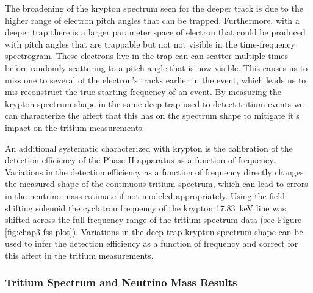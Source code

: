 The broadening of the krypton spectrum seen for the deeper track is due to the higher range of electron pitch angles that can be trapped. Furthermore, with a deeper trap there is a larger parameter space of electron that could be produced with pitch angles that are trappable but not not visible in the time-frequency spectrogram. These electrons live in the trap can can scatter multiple times before randomly scattering to a pitch angle that is now visible. This causes us to miss one to several of the electron's tracks earlier in the event, which leads us to mis-reconstruct the true starting frequency of an event. By measuring the krypton spectrum shape in the same deep trap used to detect tritium events we can characterize the affect that this has on the spectrum shape to mitigate it's impact on the tritium measurements.

An additional systematic characterized with krypton is the calibration of the detection efficiency of the Phase II apparatus as a function of frequency. Variations in the detection efficiency as a function of frequency directly changes the measured shape of the continuous tritium spectrum, which can lead to errors in the neutrino mass estimate if not modeled appropriately. Using the field shifting solenoid the cyclotron frequency of the krypton 17.83~keV line was shifted across the full frequency range of the tritium spectrum data (see Figure \ref{fig:chap3-fss-plot}). Variations in the deep trap krypton spectrum shape can be used to infer the detection efficiency as a function of frequency and correct for this affect in the tritium measurements.

\subsubsection*{Tritium Spectrum and Neutrino Mass Results}

